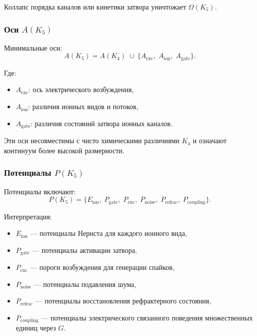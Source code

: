 Коллапс порядка каналов или кинетики затвора уничтожает $\Omega(K_5)$.

\subsubsection{Оси \texorpdfstring{$A(K_5)$}{A(K_5)}}

Минимальные оси:
\[
A(K_5) = A(K_4)\; \cup\
\{ A_{\mathrm{exc}},\; A_{\mathrm{ion}},\; A_{\mathrm{gate}} \}.
\]

Где:
\begin{itemize}
    \item $A_{\mathrm{exc}}$: ось электрического возбуждения,
    \item $A_{\mathrm{ion}}$: различия ионных видов и потоков,
    \item $A_{\mathrm{gate}}$: различия состояний затвора ионных каналов.
\end{itemize}

Эти оси несовместимы с чисто химическими различиями $K_4$ и
означают континуум более высокой размерности.

\subsubsection{Потенциалы \texorpdfstring{$P(K_5)$}{P(K_5)}}

Потенциалы включают:
\[
P(K_5)=\{
E_{\mathrm{ion}},\;
P_{\mathrm{gate}},\;
P_{\mathrm{exc}},\;
P_{\mathrm{noise}},\;
P_{\mathrm{refrac}},\;
P_{\mathrm{coupling}}
\}.
\]

Интерпретация:
\begin{itemize}
    \item $E_{\mathrm{ion}}$ — потенциалы Нернста для каждого ионного вида,
    \item $P_{\mathrm{gate}}$ — потенциалы активации затвора,
    \item $P_{\mathrm{exc}}$ — пороги возбуждения для генерации спайков,
    \item $P_{\mathrm{noise}}$ — потенциалы подавления шума,
    \item $P_{\mathrm{refrac}}$ — потенциалы восстановления рефрактерного
          состояния,
    \item $P_{\mathrm{coupling}}$ — потенциалы электрического связанного
          поведения множественных единиц через $G$.
\end{itemize}

